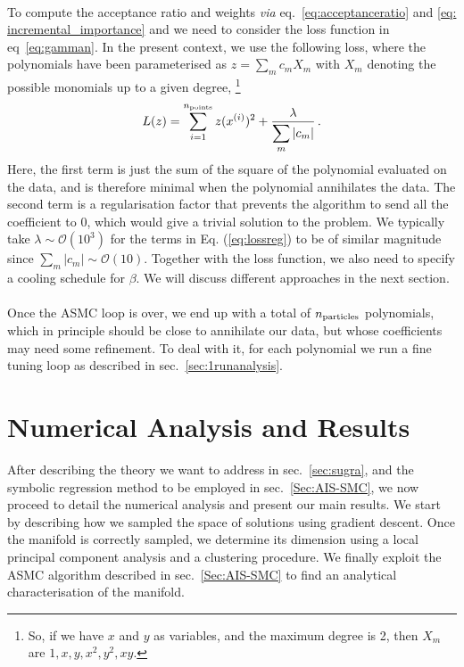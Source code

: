 \documentclass[11pt,a4paper]{article}
\begin{document}
	\paragraph{}
	To compute the acceptance ratio and weights \textit{via} eq.~\eqref{eq:acceptanceratio} and \eqref{eq: incremental_importance} and we need to consider the loss function in eq~\eqref{eq:gamman}.
	In the present context, we use the following loss, where the polynomials have been parameterised as $z = \sum_m c_m X_m$ with $X_m$ denoting the possible monomials up to a given degree,%
	\footnote{So, if we have $x$ and $y$ as variables, and the maximum degree is 2, then $X_m$ are $1, x, y, x^2, y^2, x y$.}
	\begin{equation} \label{eq:lossreg}
		L(z) = \sum_{i=1}^{n_{\rm points}} z(x^{(i)})^2 + \frac{\lambda}{\displaystyle \sum_m |c_m|}\,.
	\end{equation}
	Here, the first term is just the sum of the square of the polynomial evaluated on the data, and is therefore minimal when the polynomial annihilates the data. 
	The second term is a regularisation factor that prevents the algorithm to send all the coefficient to 0, which would give a trivial solution to the problem. 
	We typically take $\lambda \sim \mathcal{O}(10^3)$ for the terms in Eq. (\ref{eq:lossreg}) to be of similar magnitude since $\sum_m |c_m| \sim \mathcal{O}(10)$.
	Together with the loss function, we also need to specify a cooling schedule for $\beta$. We will discuss different approaches in the next section.
	
	\paragraph{}
	Once the ASMC loop is over, we end up with a total of $n_{\rm particles}$ polynomials, which in principle should be close to annihilate our data, but whose coefficients may need some refinement. To deal with it, for each polynomial we run a fine tuning loop as described in sec.~\ref{sec:1runanalysis}.
	
\section{Numerical Analysis and Results} \label{sec:results}
After describing the theory we want to address in sec.~\ref{sec:sugra}, and the symbolic regression method to be employed in sec.~\ref{Sec:AIS-SMC}, we now proceed to detail the numerical analysis and present our main results. 
We start by describing how we sampled the space of solutions using gradient descent. Once the manifold is correctly sampled, we determine its dimension using a local principal component analysis and a clustering procedure. We finally exploit the ASMC algorithm described in sec.~\ref{Sec:AIS-SMC} to find an analytical characterisation of the manifold.
\end{document}
